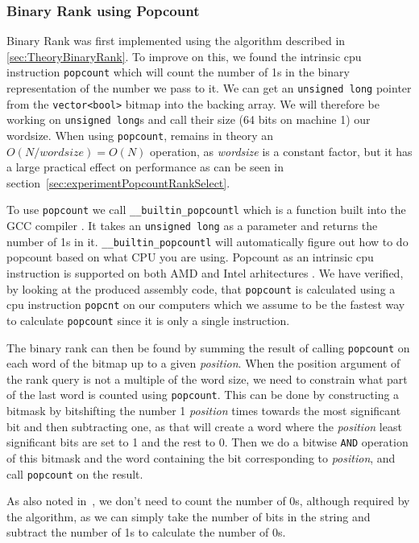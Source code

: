 \subsubsection{Binary Rank using Popcount}
\label{sec:popcountBinaryRank}
Binary Rank was first implemented using the algorithm described in \ref{sec:TheoryBinaryRank}. 
To improve on this, we found the intrinsic cpu instruction \texttt{popcount} which will count the number of 1s in the binary representation of the number we pass to it.
We can get an \texttt{unsigned long} pointer from the \texttt{vector<bool>} bitmap into the backing array. We will therefore be working on \texttt{unsigned long}s and call their size (64 bits on machine 1) our wordsize.
When using \texttt{popcount},  remains in theory an $O(N/wordsize) = O(N)$ operation, as \textit{wordsize} is a constant factor, but it has a large practical effect on performance as can be seen in section~\ref{sec:experimentPopcountRankSelect}.

To use \texttt{popcount} we call \texttt{\_\_builtin\_popcountl} which is a function built into the GCC compiler \citep{Popcount-GCC-Builtin}. 
It takes an \texttt{unsigned long} as a parameter and returns the number of 1s in it. \texttt{\_\_builtin\_popcountl} will automatically figure out how to do popcount based on what CPU you are using. Popcount as an intrinsic cpu instruction is supported on both AMD \citep{AMD-Popcount} and Intel arhitectures \citep{Intel-Popcount}.
We have verified, by looking at the produced assembly code, that \texttt{popcount} is calculated using a cpu instruction \texttt{popcnt} on our computers which we assume to be the fastest way to calculate \texttt{popcount} since it is only a single instruction.
	
The binary rank can then be found by summing the result of calling \texttt{popcount} on each word of the bitmap up to a given \textit{position}.
When the position argument of the rank query is not a multiple of the word size, we need to constrain what part of the last word is counted using \texttt{popcount}. This can be done by constructing a bitmask by bitshifting the number 1 \textit{position} times towards the most significant bit and then subtracting one, as that will create a word where the \textit{position} least significant bits are set to 1 and the rest to 0.
Then we do a bitwise \texttt{AND} operation of this bitmask and the word containing the bit corresponding to \textit{position}, and call \texttt{popcount} on the result. 

As also noted in~\citep{Navjda13}, we don't need to count the number of 0s, although required by the algorithm, as we can simply take the number of bits in the string and subtract the number of 1s to calculate the number of 0s.

